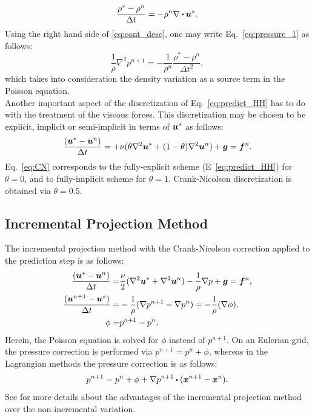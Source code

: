 \begin{equation}\label{eq:cont_desc}
\dfrac{\rho^*-\rho^n}{\Delta t}=-\rho^n \nabla \bigcdot \vect{u}^*.
\end{equation}
Using the right hand side of \ref{eq:cont_desc}, one may write  Eq.~\ref{eq:pressure_1} as follows:
\begin{equation}\label{eq:pressure_2}
\dfrac{1}{\rho} \nabla^2 p^{n+1}=-\dfrac{1}{\rho^n}\dfrac{\rho^*-\rho^n}{\Delta t^2},
\end{equation}
which takes into consideration the density variation as a source term in the Poisson equation.\\


Another important aspect of the discretization of Eq.~\ref{eq:predict_HH} has to do with the treatment of the viscous forces. This discretization may be chosen to be explicit, implicit or semi-implicit in terms of $\boldsymbol{u}^*$  as follows:    
\begin{equation}
\dfrac{(\boldsymbol{u}^*-\boldsymbol{u}^n)}{\Delta t}=+\nu(\theta \nabla^2\boldsymbol{u}^* + (1-\theta)\nabla^2\boldsymbol{u}^n)+ \boldsymbol{g}=\boldsymbol{f}^n\label{eq:CN}.
\end{equation}
Eq.~\ref{eq:CN} corresponds to the fully-explicit scheme (E~\ref{eq:predict_HH}) for $\theta=0$, and to fully-implicit scheme for $\theta=1$. Crank-Nicolson discretization is obtained via $\theta=0.5$.

\subsection{Incremental Projection Method}
The incremental projection method with the Crank-Nicolson correction applied to the prediction step is as follows:
\begin{align}
\dfrac{(\boldsymbol{u}^*-\boldsymbol{u}^n)}{\Delta t}=&\frac{\nu}{2}(\nabla^2\boldsymbol{u}^* +\nabla^2\boldsymbol{u}^n) -\dfrac{1}{\rho} \nabla p+ \boldsymbol{g}=\boldsymbol{f}^n\label{eq:CN_2},\\
\dfrac{(\boldsymbol{u}^{n+1}-\boldsymbol{u}^*)}{\Delta t}=&-\dfrac{1}{\rho} (\nabla p^{n+1}-\nabla p^{n} )=-\dfrac{1}{\rho} (\nabla \phi ) \label{eq:correct_inc},\\
\phi=&p^{n+1}-p^{n}.
\end{align}
Herein, the Poisson equation is solved for $\phi$ instead of $p^{n+1}$. On an Eulerian grid, the pressure correction is performed via $p^{n+1}=p^{n}+\phi$, whereas in the Lagrangian methods the pressure correction is as follows:
\begin{equation}
p^{n+1}=p^{n}+\phi +\nabla p^{n+1}\bigcdot(\vect{x}^{n+1}-\vect{x}^{n}).
\end{equation}
See \cite{Trask2ndOrder2015,Hosseini2011} for more details about the advantages of the incremental projection method over the non-incremental variation.

